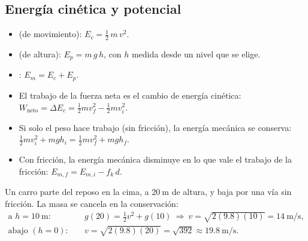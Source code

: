 \documentclass[11pt,a4paper]{article}
\begin{document}
\subsection{Energía cinética y potencial}
\begin{definicion}
\begin{itemize}
\item {} (de movimiento): $E_c=\tfrac12\,m\,v^{2}$.
\item {} (de altura): $E_p=m\,g\,h$, con $h$ medida desde un nivel que se elige.
\item {}: $E_m=E_c+E_p$.
\end{itemize}
\end{definicion}
\begin{propiedad}
\begin{itemize}
\item El trabajo de la fuerza neta es el cambio de energía cinética: $W_{\text{neto}}=\Delta E_c=\tfrac12mv_f^2-\tfrac12mv_i^2$.
\item Si solo el peso hace trabajo (sin fricción), la energía mecánica se conserva:
      $\tfrac12mv_i^2+mgh_i=\tfrac12mv_f^2+mgh_f$.
\item Con fricción, la energía mecánica disminuye en lo que vale el trabajo de la fricción: $E_{m,f}=E_{m,i}-f_k\,d$.
\end{itemize}
\end{propiedad}
\begin{ejemplo}
Un carro parte del reposo en la cima, a $\SI{20}{\meter}$ de altura, y baja por una vía sin fricción.
La masa se cancela en la conservación:
\begin{align*}
\text{a } h=\SI{10}{\meter}:&\quad g(20)=\tfrac12v^2+g(10)\ \Rightarrow\ v=\sqrt{2(9.8)(10)}=\SI{14}{\meter\per\second},\\
\text{abajo } (h=0):&\quad v=\sqrt{2(9.8)(20)}=\sqrt{392}\approx\SI{19.8}{\meter\per\second}.
\end{align*}
\end{ejemplo}
\end{document}
